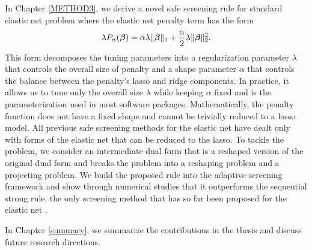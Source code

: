 In Chapter \ref{METHOD3}, we derive a novel safe screening rule for standard elastic net problem where the elastic net penalty term has the form
\begin{equation}
    \lambda P_\alpha(\boldsymbol\beta)=\alpha \lambda \lVert\boldsymbol\beta\rVert_1+\frac{\alpha}{2}\lambda\lVert\boldsymbol\beta\rVert_2^2.
\end{equation}
This form decomposes the tuning parameters into a regularization parameter $\lambda$ that controls the overall size of penalty and a shape parameter $\alpha$ that controls the balance between the penalty's lasso and ridge components. In practice, it allows us to tune only the overall size $\lambda$ while keeping $\alpha$ fixed and is the parameterization used in most software packages. Mathematically, the penalty function does not have a fixed shape and cannot be trivially reduced to a lasso model. All previous safe screening methods for the elastic net have dealt only with forms of the elastic net that can be reduced to the lasso. To tackle the problem, we consider an intermediate dual form that is a reshaped version of the original dual form and breaks the problem into a reshaping problem and a projecting problem. We build the proposed rule into the adaptive screening framework and show through numerical studies that it outperforms the sequential strong rule, the only screening method that has so far been proposed for the elastic net \citep{Tibshirani2012}.

In Chapter \ref{summary}, we summarize the contributions in the thesis and discuss future research directions.
